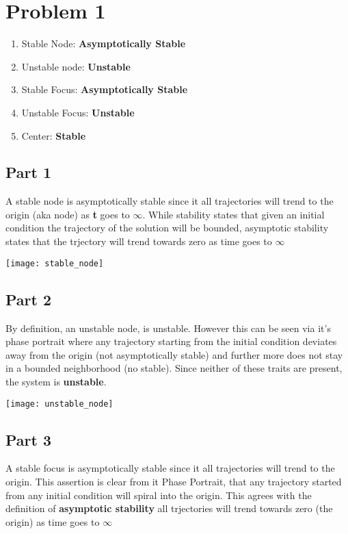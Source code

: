 \section*{Problem 1}

\begin{enumerate}
  \item Stable Node: \textbf{Asymptotically Stable}
  \item Unstable node: \textbf{Unstable}
  \item Stable Focus: \textbf{Asymptotically Stable}
  \item Unstable Focus: \textbf{Unstable}
  \item Center: \textbf{ Stable}
\end{enumerate}

\subsection*{Part 1}
A stable node is asymptotically stable since it all trajectories will trend to the origin (aka node) as \textbf{t} goes to $\infty$. While stability states that given an initial condition the trajectory of the solution will be bounded, asymptotic stability states that the trjectory will trend towards zero as time goes to $\infty$

\begin{center}
  \texttt{[image: stable\_node]}
\end{center}

\subsection*{Part 2}
By definition, an unstable node, is unstable. However this can be seen via it's phase portrait where any trajectory starting from the initial condition deviates away from the origin (not asymptotically stable) and further more does not stay in a bounded neighborhood (no stable). Since neither of these traits are present, the system is \textbf{unstable}.

\begin{center}
  \texttt{[image: unstable\_node]}
\end{center}

\subsection*{Part 3}
A stable focus is asymptotically stable since it all trajectories will trend to the origin. This assertion is clear from it Phase Portrait, that any trajectory started from any initial condition will spiral into the origin. This agrees with the definition of \textbf{asymptotic stability} all trjectories will trend towards zero (the origin) as time goes to $\infty$

